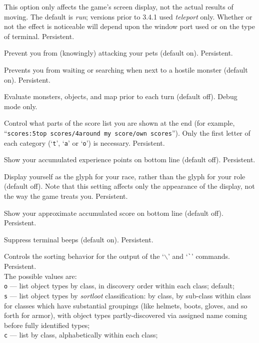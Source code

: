 This option only affects the game's screen display, not the actual
results of moving.  The default is {\it run\/}; versions prior to 3.4.1
used {\it teleport\/} only.  Whether or not the effect is noticeable will
depend upon the window port used or on the type of terminal.  Persistent.
\item[\ib{safe\verb+_+pet}]
Prevent you from (knowingly) attacking your pets (default on).  Persistent.
\item[\ib{safe\verb+_+wait}]
Prevents you from waiting or searching when next to a hostile monster
(default on).  Persistent.
\item[\ib{sanity\verb+_+check}]
Evaluate monsters, objects, and map prior to each turn (default off).
Debug mode only.
\item[\ib{scores}]
Control what parts of the score list you are shown at the end (for example,
``{\tt scores:5top scores/4around my score/own scores}'').  Only the first
letter of each category (`{\tt t}', `{\tt a}' or `{\tt o}') is necessary.
Persistent.
\item[\ib{showexp}]
Show your accumulated experience points on bottom line (default off).
Persistent.
\item[\ib{showrace}]
Display yourself as the glyph for your race, rather than the glyph
for your role (default off).  Note that this setting affects only
the appearance of the display, not the way the game treats you.
Persistent.
\item[\ib{showscore}]
Show your approximate accumulated score on bottom line (default off).
Persistent.
\item[\ib{silent}]
Suppress terminal beeps (default on).  Persistent.
\item[\ib{sortdiscoveries}]
Controls the sorting behavior for the output of the `{\tt $\backslash$}'
and `{\tt \`{}}' commands.
Persistent.
\\
The possible values are:
\\
{\tt o} --- list object types by class, in discovery order within each class;
default;
\\
{\tt s} --- list object types by {\it sortloot\/}
classification: by class, by sub-class within class for classes which
have substantial groupings (like helmets, boots, gloves, and so forth
for armor), with object types partly-discovered via assigned name coming
before fully identified types;
\\
{\tt c} --- list by class, alphabetically within each class;\\
